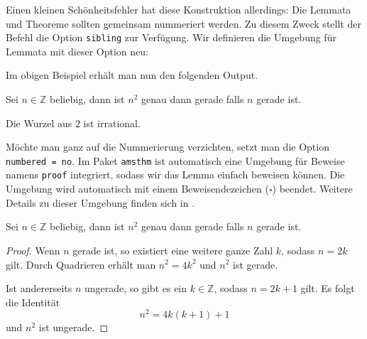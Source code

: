 Einen kleinen Schönheitsfehler hat diese Konstruktion allerdings: Die Lemmata und Theoreme sollten gemeinsam nummeriert werden. Zu diesem Zweck stellt der Befehl  die Option \texttt{sibling} zur Verfügung.
Wir definieren die Umgebung für Lemmata mit dieser Option neu:

\begin{example}
\end{example}

Im obigen Beispiel erhält man nun den folgenden Output.

\begin{LTXexample}[firstline=2]
\setcounter{thm}{0}
\begin{lem}
    Sei $n \in \mathbb Z$ 
    beliebig, dann ist $n^2$ 
    genau dann gerade 
    falls $n$ gerade ist.
\end{lem}

\begin{thm}
    Die Wurzel aus $2$ ist 
    irrational.
\end{thm}
\end{LTXexample}

Möchte man ganz auf die Nummerierung verzichten, setzt man die Option \verb|numbered = no|.
Im Paket \texttt{amsthm} ist automatisch eine Umgebung für Beweise namens \texttt{proof} integriert, sodass wir das Lemma einfach beweisen können.
Die Umgebung wird automatisch mit einem Beweisendezeichen ($\square$) beendet.
Weitere Details zu dieser Umgebung finden sich in \cite{amsthm}.

\begin{LTXexample}[firstline=3]
\setcounter{thm}{0}
\setcounter{lem0}{0}
\begin{lem0}
    Sei $n \in \mathbb Z$ 
    beliebig, dann ist $n^2$ 
    genau dann gerade 
    falls $n$ gerade ist.
\end{lem0}

\begin{proof}
    Wenn $n$ gerade ist, 
    so existiert eine 
    weitere ganze Zahl $k$,
    sodass $n = 2 k$ gilt. 
    Durch Quadrieren erhält 
    man $n^2 = 4 k^2$ und 
    $n^2$ ist gerade.
    
    Ist andererseits $n$ 
    ungerade, so gibt es ein 
    $k \in \mathbb Z$, sodass 
    $n = 2 k + 1$ gilt. 
    Es folgt die Identität 
    \[n^2 = 4 k (k + 1) + 1\] 
    und $n^2$ ist ungerade.
\end{proof}
\end{LTXexample}


